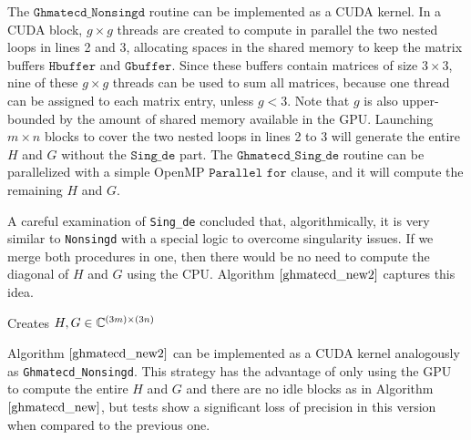 The $\texttt{Ghmatecd\_Nonsingd}$ routine can be implemented as a CUDA kernel. In a CUDA block, $g \times g$ 
threads are created to compute in parallel the two nested loops in lines 2 and 3, allocating spaces in the shared 
memory to keep the matrix buffers $\texttt{Hbuffer}$ and $\texttt{Gbuffer}$. Since these buffers contain matrices of size 
$3 \times 3$, nine of these $g \times g$ threads can be used to 
sum all matrices, because one thread can be assigned to each matrix entry, unless $g < 3$. Note that $g$ is also upper-bounded by the 
amount of shared memory available in the GPU. Launching $m \times n$ blocks to cover the two nested loops in lines
2 to 3 will generate the entire $H$ and $G$ without the $\texttt{Sing\_de}$ part. The $\texttt{Ghmatecd\_Sing\_de}$ routine can be parallelized with 
a simple OpenMP $\texttt{Parallel for}$ clause, and it will compute the remaining $H$ and $G$. 

A careful examination of \texttt{Sing\_de} concluded that, algorithmically, it is very similar to \texttt{Nonsingd} 
with a special logic to overcome singularity issues. If we merge both procedures in one, then there would 
be no need to compute the diagonal of $H$ and $G$ using the CPU. Algorithm $\ref{ghmatecd_new2}$ captures this idea.

\begin{algorithm}[H]
\caption{Creates $H, G \in \mathbb{C}^{(3m)\times(3n)}$ }
\label{ghmatecd_new2}
\begin{algorithmic}[1]
						\EndIf
					\EndFor
				\EndFor
			\EndFor
	 \EndFor
	\EndProcedure
\end{algorithmic}
\end{algorithm}

Algorithm $\ref{ghmatecd_new2}$ can be implemented as a CUDA kernel analogously as \texttt{Ghmatecd\_Nonsingd}. This strategy has the advantage 
of only using the GPU to compute the entire $H$ and $G$ and there are no idle blocks as in Algorithm $\ref{ghmatecd_new}$, but tests show a 
significant loss of precision in this version when compared to the previous one.

